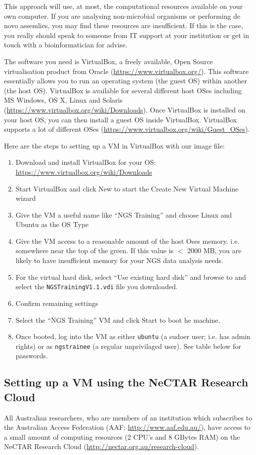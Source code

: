 This approach will use, at most, the computational resources available on
your own computer. If you are analysing non-microbial organisms or performing
de novo assemlies, you may find these resources are insufficient. If this is the
case, you really should speak to someone from IT support at your institution or
get in touch with a bioinformatician for advise.

The software you need is VirtualBox, a freely available, Open Source
virtualisation product from Oracle (\url{https://www.virtualbox.org/}). This
software essentially allows you to run an operating system (the guest OS) within
another (the host OS). VirtualBox is available for several different host OSes
including MS Windows, OS X, Linux and Solaris
(\url{https://www.virtualbox.org/wiki/Downloads}). Once VirtualBox is installed
on your host OS, you can then install a guest OS inside VirtualBox. VirtualBox
supports a lot of different OSes
(\url{https://www.virtualbox.org/wiki/Guest_OSes}).

Here are the steps to setting up a VM in VirtualBox with our image file:
\begin{enumerate}
  \item Download and install VirtualBox for your OS: 
  \url{https://www.virtualbox.org/wiki/Downloads}
  \item Start VirtualBox and click New to start the Create New Virtual Machine wizard
  \item Give the VM a useful name like ``NGS Training'' and choose Linux and
  Ubuntu as the OS Type
  \item Give the VM access to a reasonable amount of the host Oses memory. i.e.
  somewhere near the top of the green. If this value is $<$ 2000 MB, you are
  likely to have insufficient memory for your NGS data analysis needs.
  \item For the virtual hard disk, select ``Use existing hard disk'' and browse
  to and select the \texttt{NGSTrainingV1.1.vdi} file you downloaded.
  \item Confirm remaining settings
  \item Select the ``NGS Training'' VM and click Start to boot he machine.
  \item Once booted, log into the VM as either \texttt{ubuntu} (a sudoer user;
  i.e. has admin rights) or as \texttt{ngstrainee} (a regular unprivilaged
  user). See table below for passwords.
\end{enumerate}


\subsection{Setting up a VM using the NeCTAR Research Cloud}
All Australian researchers, who are members of an institution which subscribes
to the Australian Access Federation (AAF; \url{http://www.aaf.edu.au/}), have
access to a small amount of computing resources (2 CPU's and 8 GBytes RAM) on
the NeCTAR Research Cloud (\url{http://nectar.org.au/research-cloud}).

